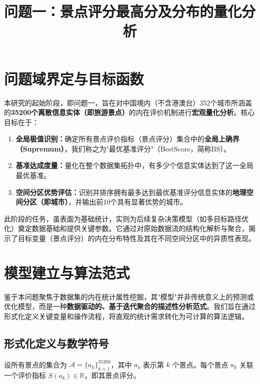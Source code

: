 \documentclass[12pt]{article}
\title{\textbf{问题一：景点评分最高分及分布的量化分析}}
\author{}
\date{}
\newcommand{\BS}{\text{BS}}
\begin{document}
\maketitle

\section{问题域界定与目标函数}

本研究的起始阶段，即问题一，旨在对中国境内（不含港澳台）352个城市所涵盖的\textbf{35200个离散信息实体（即旅游景点）}的内在评价机制进行\textbf{宏观量化分析}。核心目标在于：

\begin{enumerate}[leftmargin=*]
    \item \textbf{全局极值识别：}确定所有景点评价指标（景点评分）集合中的\textbf{全局上确界（Supremum）}，我们称之为"最优基准评分"（BestScore，简称$\BS$）。
    
    \item \textbf{基准达成度量：}量化在整个数据集拓扑中，有多少个信息实体达到了这一全局最优基准。
    
    \item \textbf{空间分区优势评估：}识别并排序拥有最多达到最优基准评分信息实体的\textbf{地理空间分区（即城市）}，并输出前10个具有显著优势的城市。
\end{enumerate}

此阶段的任务，虽表面为基础统计，实则为后续复杂决策模型（如多目标路径优化）奠定数据基础和提供关键参数。它通过对原始数据流的结构化解析与聚合，揭示了目标变量（景点评分）的内在分布特性及其在不同空间分区中的异质性表现。

\section{模型建立与算法范式}

鉴于本问题聚焦于数据集的内在统计属性挖掘，其"模型"并非传统意义上的预测或优化模型，而是一种\textbf{数据驱动的、基于迭代聚合的描述性分析范式}。我们旨在通过形式化定义关键变量和操作流程，将直观的统计需求转化为可计算的算法逻辑。

\subsection{形式化定义与数学符号}

设所有景点的集合为 $\mathcal{A} = \{a_k\}_{k=1}^{35200}$，其中 $a_k$ 表示第 $k$ 个景点。每个景点 $a_k$ 关联一个评价指标 $S(a_k) \in \mathbb{R}$，即其景点评分。
\end{document}

